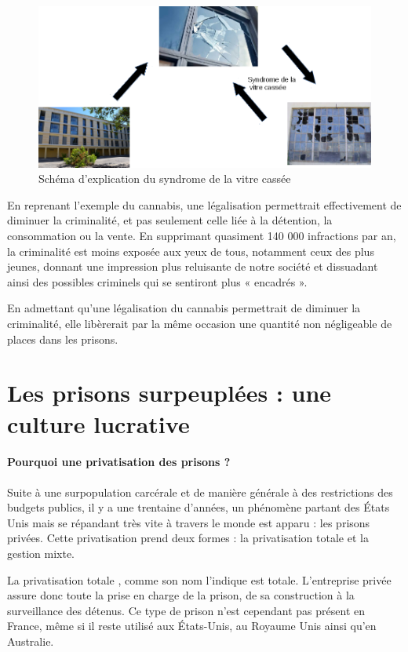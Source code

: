 \begin{figure}\centering
\includegraphics[width=.8\textwidth]{images/vitrecassee.png}
\caption{Schéma d’explication du syndrome de la vitre cassée}
\end{figure}

    En reprenant l’exemple du cannabis, une légalisation permettrait effectivement de diminuer la criminalité, et pas seulement celle liée à la détention, la consommation ou la vente. En supprimant quasiment 140 000 infractions par an, la criminalité est moins exposée aux yeux de tous, notamment ceux des plus jeunes, donnant une impression plus reluisante de notre société et dissuadant ainsi des possibles criminels qui se sentiront plus « encadrés ».

    En admettant qu’une légalisation du cannabis permettrait de diminuer la criminalité, elle libèrerait par la même occasion une quantité non négligeable de places dans les prisons.
    

\section{Les prisons surpeuplées : une culture lucrative}

\paragraph{Pourquoi une privatisation des prisons ?}

    Suite à une surpopulation carcérale et de manière générale à des restrictions des budgets publics, il y a une trentaine d’années, un phénomène partant des États Unis mais se répandant très vite à travers le monde est apparu : les prisons privées. Cette privatisation prend deux formes : la privatisation totale et la gestion mixte.

    La privatisation totale \cite{dufresne10}, comme son nom l’indique est totale. L’entreprise privée assure donc toute la prise en charge de la prison, de sa construction à la surveillance des détenus. Ce type de prison n’est cependant pas présent en France, même si il reste utilisé aux États-Unis, au Royaume Unis ainsi qu’en Australie.

